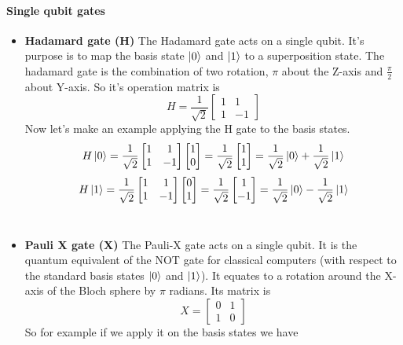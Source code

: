 \documentclass[main.tex]{subfiles}
\begin{document}
	\paragraph{Single qubit gates}
	\begin{itemize}
	\item \textbf{Hadamard gate (H)} The Hadamard gate acts on a single qubit. It's purpose is to map the
	basis state $\ket{0}$  and $\ket{1}$ to a superposition state.
	The hadamard gate is the combination of two rotation, $\pi$ about the Z-axis and 
	$\frac{\pi}{2}$ about Y-axis. 
	So it's operation matrix is
	\begin{equation}
	H=\frac{1}{\sqrt{2}}
	\begin{bmatrix}
	1 & 1\\
	1 & -1
	\end{bmatrix}
	\end{equation}
	Now let's make an example applying the H gate to the basis states.
	\begin{equation}
	H\ket{0}=\frac{1}{\sqrt{2}}
	\begin{bmatrix}
	1 & 1\\
	1 & -1
	\end{bmatrix}
	\begin{bmatrix}
	1 \\
	0
	\end{bmatrix}
	=\frac{1}{\sqrt{2}}
	\begin{bmatrix}
	1 \\
	1
	\end{bmatrix}
	=
	\frac{1}{\sqrt{2}}\ket{0}+\frac{1}{\sqrt{2}}\ket{1}
	\end{equation}
	\begin{equation}
	H\ket{1}=\frac{1}{\sqrt{2}}
	\begin{bmatrix}
	1 & 1\\
	1 & -1
	\end{bmatrix}
	\begin{bmatrix}
	0 \\
	1
	\end{bmatrix}
	=\frac{1}{\sqrt{2}}
	\begin{bmatrix}
	1 \\
	-1
	\end{bmatrix}
	=
	\frac{1}{\sqrt{2}}\ket{0}-\frac{1}{\sqrt{2}}\ket{1}
	\end{equation}\\
	
	\item \textbf{Pauli X gate (X)} The Pauli-X gate acts on a single qubit. It is the quantum equivalent of the NOT gate for classical 
	computers (with respect to the standard basis states $\ket{0}$ and $\ket{1}$).  It equates to a rotation around the X-axis of the
	Bloch sphere by $\pi$ radians. Its matrix is 
	\begin{equation}
	X=
	\begin{bmatrix}
	0 & 1\\
	1 & 0
	\end{bmatrix}
	\end{equation}
	So for example if we apply it on the basis states we have
	

\end{itemize}
\end{document}
